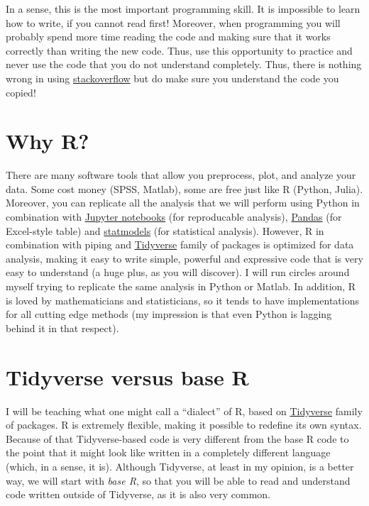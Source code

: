 \documentclass[
]{book}
\begin{document}
In a sense, this is the most important programming skill. It is impossible to learn how to write, if you cannot read first! Moreover, when programming you will probably spend more time reading the code and making sure that it works correctly than writing the new code. Thus, use this opportunity to practice and never use the code that you do not understand completely. Thus, there is nothing wrong in using \href{https://stackoverflow.com/}{stackoverflow} but do make sure you understand the code you copied!

\hypertarget{why-r}{%
\section*{Why R?}\label{why-r}}

There are many software tools that allow you preprocess, plot, and analyze your data. Some cost money (SPSS, Matlab), some are free just like R (Python, Julia). Moreover, you can replicate all the analysis that we will perform using Python in combination with \href{https://jupyter.org/}{Jupyter notebooks} (for reproducable analysis), \href{https://pandas.pydata.org/}{Pandas} (for Excel-style table) and \href{https://www.statsmodels.org/stable/index.html}{statmodels} (for statistical analysis). However, R in combination with piping and \href{https://www.tidyverse.org/}{Tidyverse} family of packages is optimized for data analysis, making it easy to write simple, powerful and expressive code that is very easy to understand (a huge plus, as you will discover). I will run circles around myself trying to replicate the same analysis in Python or Matlab. In addition, R is loved by mathematicians and statisticians, so it tends to have implementations for all cutting edge methods (my impression is that even Python is lagging behind it in that respect).

\hypertarget{tidyverse-versus-base-r}{%
\section*{Tidyverse versus base R}\label{tidyverse-versus-base-r}}

I will be teaching what one might call a ``dialect'' of R, based on \href{https://www.tidyverse.org/}{Tidyverse} family of packages. R is extremely flexible, making it possible to redefine its own syntax. Because of that Tidyverse-based code is very different from the base R code to the point that it might look like written in a completely different language (which, in a sense, it is). Although Tidyverse, at least in my opinion, is a better way, we will start with \emph{base R}, so that you will be able to read and understand code written outside of Tidyverse, as it is also very common.
\end{document}
